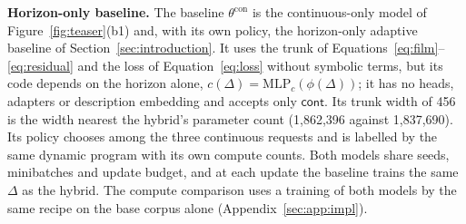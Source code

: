 \textbf{Horizon-only baseline.} The baseline $\theta^{\mathrm{con}}$ is the continuous-only model of Figure~\ref{fig:teaser}(b1) and, with its own policy, the horizon-only adaptive baseline of Section~\ref{sec:introduction}. It uses the trunk of Equations~\ref{eq:film}--\ref{eq:residual} and the loss of Equation~\ref{eq:loss} without symbolic terms, but its code depends on the horizon alone, $c(\Delta)=\mathrm{MLP}_c(\phi(\Delta))$; it has no heads, adapters or description embedding and accepts only $\textsf{cont}$. Its trunk width of 456 is the width nearest the hybrid's parameter count (1,862,396 against 1,837,690). Its policy chooses among the three continuous requests and is labelled by the same dynamic program with its own compute counts. Both models share seeds, minibatches and update budget, and at each update the baseline trains the same $\Delta$ as the hybrid. The compute comparison uses a training of both models by the same recipe on the base corpus alone (Appendix~\ref{sec:app:impl}).

